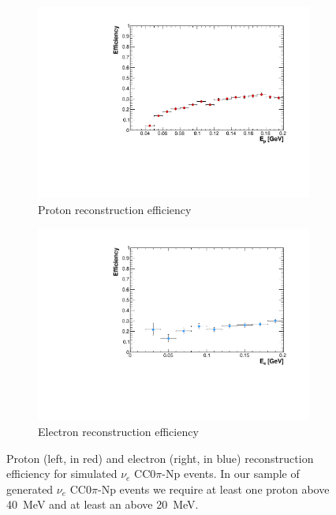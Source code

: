 \begin{figure}[htbp]
  \begin{subfigure}{0.48\textwidth}
    \includegraphics[width=\linewidth]{figures/proton_eff.pdf}
    \caption{Proton reconstruction efficiency} 
  \end{subfigure}
    \begin{subfigure}{0.48\textwidth}
    \includegraphics[width=\linewidth]{figures/electron_eff.pdf}
    \caption{Electron reconstruction efficiency} 
  \end{subfigure}
  \caption{Proton (left, in red) and electron (right, in blue) reconstruction efficiency for simulated $\nu_{e}$ CC$0\pi$-Np events. In our sample of generated $\nu_{e}$ CC$0\pi$-Np events we require at least one proton above 40~MeV and at least an above 20~MeV.}
  \label{fig:kin_eff}
\end{figure}



